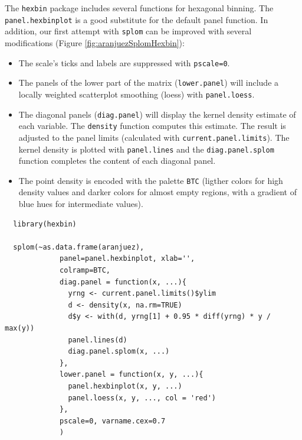 The \texttt{hexbin} package \cite{Carr.Lewin-Koh.ea2013} includes several
functions for hexagonal binning.  The \texttt{panel.hexbinplot} is a good
substitute for the default panel function. In addition, our first
attempt with \texttt{splom} can be improved with several modifications
(Figure \ref{fig:aranjuezSplomHexbin}):
\begin{itemize}
\item The scale's ticks and labels are suppressed with \texttt{pscale=0}.
\item The panels of the lower part of the matrix (\texttt{lower.panel}) will
include a locally weighted scatterplot smoothing (loess) with
\texttt{panel.loess}.
\item The diagonal panels (\texttt{diag.panel}) will display the kernel
density estimate of each variable. The \texttt{density} function
computes this estimate. The result is adjusted to the panel
limits (calculated with \texttt{current.panel.limits}). The kernel
density is plotted with \texttt{panel.lines} and the \texttt{diag.panel.splom}
function completes the content of each diagonal panel.
\item The point density is encoded with the palette \texttt{BTC} (ligther
colors for high density values and darker colors for almost
empty regions, with a gradient of blue hues for intermediate values).
\end{itemize}


\lstset{language=R,label= ,caption= ,captionpos=b,numbers=none}
\begin{lstlisting}
  library(hexbin)
  
  splom(~as.data.frame(aranjuez),
             panel=panel.hexbinplot, xlab='',
             colramp=BTC,
             diag.panel = function(x, ...){
               yrng <- current.panel.limits()$ylim
               d <- density(x, na.rm=TRUE)
               d$y <- with(d, yrng[1] + 0.95 * diff(yrng) * y / max(y))
               panel.lines(d)
               diag.panel.splom(x, ...)
             },
             lower.panel = function(x, y, ...){
               panel.hexbinplot(x, y, ...)
               panel.loess(x, y, ..., col = 'red')
             },
             pscale=0, varname.cex=0.7
             )
\end{lstlisting}

